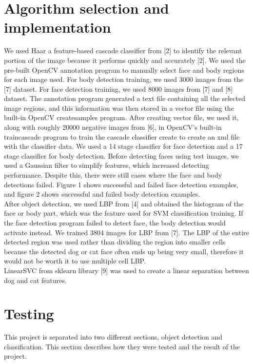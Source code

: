 \documentclass[conference,compsoc]{IEEEtran}
\begin{document}
\section{Algorithm selection and implementation}
We used Haar a feature-based cascade classifier from [2] to identify the relevant portion of the image  because it performs quickly and accurately [2]. We used the pre-built OpenCV annotation program to manually select face and body regions for each image used. For body detection training, we used 3000 images from the [7] dataset. For face detection training, we used 8000 images from [7] and [8] dataset. The annotation program generated a text file containing all the selected image regions, and this information was then stored in a vector file using the built-in OpenCV createsamples program. After creating vector file, we used it, along with roughly 20000 negative images from [6], in OpenCV's built-in traincascade program to train the cascade classifier create to create an xml file with the classifier data. We used a 14 stage classifier for face detection and a 17 stage classifier for body detection. Before detecting faces using test images, we used a Gaussian filter to simplify features, which increased detecting performance. Despite this, there were still cases where the face and body detections failed. Figure 1 shows successful and failed face detection examples, and figure 2 shows successful and failed body detection examples.\\

After object detection, we used LBP from [4] and obtained the histogram of the face or body part, which was the feature used for SVM classification training. If the face detection program failed to detect face, the body detection would activate instead. We trained 3804 images for LBP from [7]. The LBP of the entire detected region was used rather than dividing the region into smaller cells because the detected dog or cat face often ends up being very small, therefore it would not be worth it to use multiple cell LBP.\\

LinearSVC from sklearn library [9] was used to create a linear separation between dog and cat features.


\section{Testing}
This project is separated into two different sections, object detection and classification.  This section describes how they were tested and the result of the project.
\end{document}
